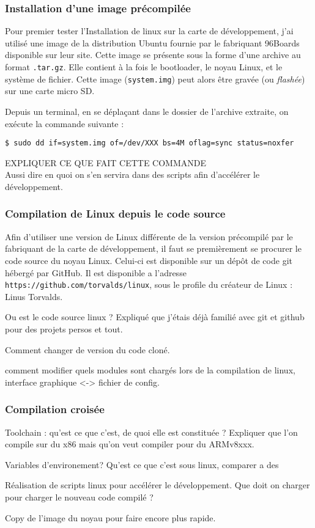 \subsubsection{Installation d'une image précompilée}

Pour premier tester l'Installation de linux sur la carte de développement, j'ai utilisé une image de la distribution Ubuntu fournie par le fabriquant 96Boards disponible sur leur site. Cette image se présente sous la forme d'une archive au format \texttt{.tar.gz}. Elle contient à la fois le \gls{bootloader}, le noyau Linux, et le système de fichier. Cette image (\texttt{system.img}) peut alors être gravée (ou \textit{flashée}) sur une carte micro SD. 

Depuis un terminal, en se déplaçant dans le dossier de l'archive extraite, on exécute la commande suivante : 
\begin{lstlisting}[style=command]
$ sudo dd if=system.img of=/dev/XXX bs=4M oflag=sync status=noxfer
\end{lstlisting}

\begin{center}
    \color{red}
    EXPLIQUER CE QUE FAIT CETTE COMMANDE \\
    Aussi dire en quoi on s'en servira dans des scripts afin d'accélérer le développement.
\end{center}


\subsubsection{Compilation de Linux depuis le code source}\label{sec:compilation-linux-source}

Afin d'utiliser une version de Linux différente de la version précompilé par le fabriquant de la carte de développement, il faut se premièrement se procurer le code source du noyau Linux. Celui-ci est disponible sur un dépôt de code \gls{git} hébergé par GitHub. Il est disponible a l'adresse \texttt{https://github.com/torvalds/linux}, sous le profile du créateur de Linux : Linus Torvalds.


Ou est le code source linux ? Expliqué que j'étais déjà familié avec git et github pour des projets persos et tout.

Comment changer de version du code cloné. 

comment modifier quels modules sont chargés lors de la compilation de linux, interface graphique <-> fichier de config.
\subsubsection{Compilation croisée}

Toolchain : qu'est ce que c'est, de quoi elle est constituée ? Expliquer que l'on compile sur du x86 mais qu'on veut compiler pour du ARMv8xxx.

Variables d'environement? Qu'est ce que c'est sous linux, comparer a des 

Réalisation de scripts linux pour accélérer le développement. Que doit on charger pour charger le nouveau code compilé ?

Copy de l'image du noyau pour faire encore plus rapide.

